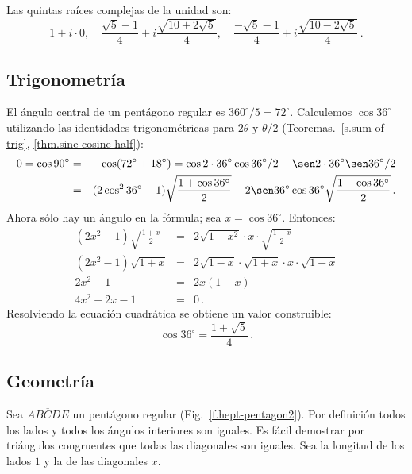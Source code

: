 \begin{advanced}
Las quintas raíces complejas de la unidad son:
\[
1+i\cdot 0,\quad\frac{\sqrt{5}-1}{4}\pm i \frac{\sqrt{10+2\sqrt{5}}}{4},\quad\frac{-\sqrt{5}-1}{4}\pm i \frac{\sqrt{10-2\sqrt{5}}}{4}\,.
\]
\end{advanced}

\subsection{Trigonometría}
El ángulo central de un pentágono regular es $360^\circ/5=72^\circ$. Calculemos $\cos 36^\circ$ utilizando las identidades trigonométricas para $2\theta$ y $\theta/2$ (Teoremas.~\ref{s.sum-of-trig}, \ref{thm.sine-cosine-half}):
\begin{eqnarray*}
0=\cos 90^\circ &=& \cos(72^\circ+18^\circ)=\cos 2\cdot 36^\circ\cos 36^\circ/2 - \sen 2\cdot 36^\circ\sen 36^\circ/2\\
&=&(2\cos^2 36^\circ-1)\sqrt{\frac{1+\cos 36^\circ}{2}}-2\sen 36^\circ\cos 36^\circ\sqrt{\frac{1-\cos 36^\circ}{2}}\,.
\end{eqnarray*}
Ahora sólo hay un ángulo en la fórmula; sea $x=\cos 36^\circ$. Entonces:
\begin{eqnarray*}
(2x^2-1)\sqrt{\frac{1+x}{2}}&=&2\sqrt{1-x^2}\cdot x \cdot \sqrt{\frac{1-x}{2}}\\
(2x^2-1)\sqrt{1+x}&=&2\sqrt{1-x}\cdot\sqrt{1+x}\cdot x \cdot \sqrt{1-x}\\
2x^2-1&=&2x(1-x)\\
4x^2-2x-1&=&0\,.
\end{eqnarray*}
Resolviendo la ecuación cuadrática se obtiene un valor construible:
\[
\cos 36^\circ = \frac{1+\sqrt{5}}{4}\,.
\]

\subsection{Geometría}\label{s.geometry-pentagon}

Sea $\overline{ABCDE}$ un pentágono regular (Fig.~\ref{f.hept-pentagon2}). Por definición todos los lados y todos los ángulos interiores son iguales. Es fácil demostrar por triángulos congruentes que todas las diagonales son iguales. Sea la longitud de los lados $1$ y la de las diagonales $x$.

